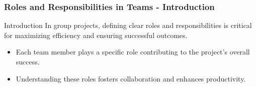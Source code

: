 \documentclass[aspectratio=169]{beamer}
\begin{document}
\begin{frame}[fragile]
    \frametitle{Roles and Responsibilities in Teams - Introduction}
    \begin{block}{Introduction}
        In group projects, defining clear roles and responsibilities is critical for maximizing efficiency and ensuring successful outcomes. 
        \begin{itemize}
            \item Each team member plays a specific role contributing to the project's overall success.
            \item Understanding these roles fosters collaboration and enhances productivity.
        \end{itemize}
    \end{block}
\end{frame}
\end{document}

